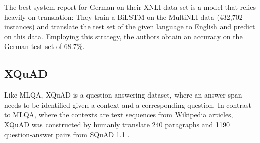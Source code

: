 








The best system \cite{conneau2018xnli} report for German on their XNLI data set is a model that
relies heavily on translation: They train a BiLSTM on the MultiNLI data (432,702 instances) and
translate the test set of the given language to English and predict on this data. Employing this
strategy, the authors obtain an accuracy on the German test set of 68.7\%.



\subsection{XQuAD}

Like MLQA, XQuAD \citep{artetxe2019cross} is a question answering dataset, where an answer span
needs to be identified given a context and a corresponding question. In contrast to MLQA, where the
contexts are text sequences from Wikipedia articles, XQuAD was constructed by humanly translate 240
paragraphs and 1190 question-answer pairs from SQuAD 1.1 \citep{rajpurkar2016squad}.


